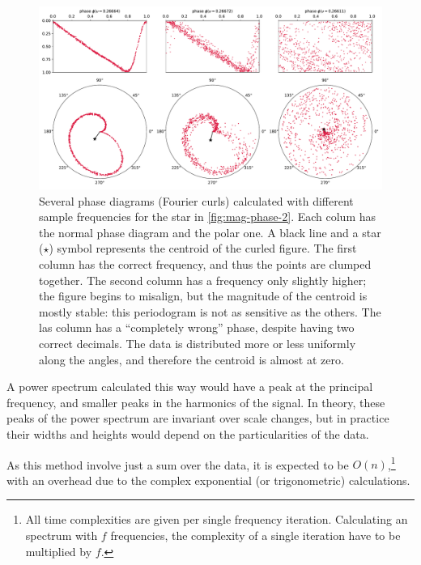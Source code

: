 	\begin{figure}
		\centering
		\includegraphics[width=\textwidth]{img/complex_phase_off.pdf}
		\caption[Off-frequency phase diagrams: real and complex]{
			Several phase diagrams (Fourier curls) calculated with different sample frequencies for the star in \autoref{fig:mag-phase-2}.
			Each colum has the normal phase diagram and the polar one. A black line and a star ($\star$) symbol represents the centroid of the curled figure.
			The first column has the correct frequency, and thus the points are clumped together.
			The second column has a frequency only slightly higher; the figure begins to misalign, 
			but the magnitude of the centroid is mostly stable: this periodogram is not as sensitive as the others.
			The las column has a \enquote{completely wrong} phase, despite having two correct decimals.
			The data is distributed more or less uniformly along the angles, and therefore the centroid is almost at zero.
		}
		\label{fig:complex-phase-off}
	\end{figure}
	
	A power spectrum calculated this way would have a peak at the principal frequency, and smaller peaks in the harmonics of the signal.
	In theory, these peaks of the power spectrum are invariant over scale changes, 
	but in practice their widths and heights would depend on the particularities of the data.
	
	As this method involve just a sum over the data, it is expected to be $O(n)$,\footnote{
		All time complexities are given per single frequency iteration. 
		Calculating an spectrum with $f$ frequencies, the complexity of a single iteration have to be multiplied by $f$.
	} 
	with an overhead due to the complex exponential (or trigonometric) calculations.
	

